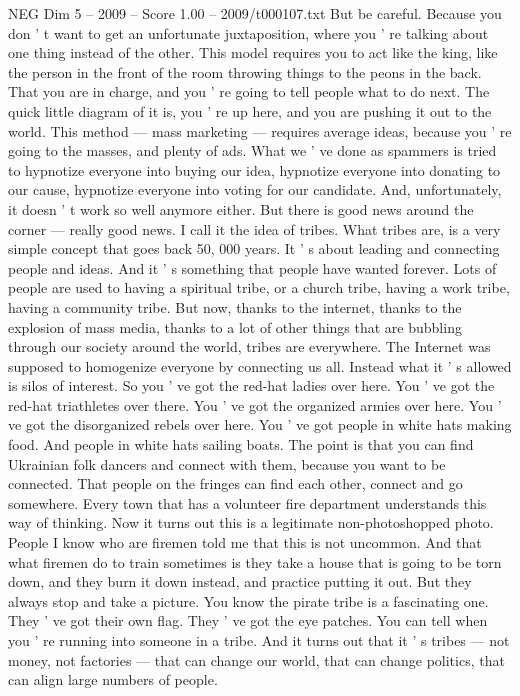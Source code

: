 \begin{textsample}{NEG Dim 5 – 2009 – Score 1.00 – 2009/t000107.txt}
But be careful.
Because you don ' t want to get an unfortunate juxtaposition, where you ' re talking about one thing instead of the other.
This model requires you to act like the king, like the person in the front of the room throwing things to the peons in the back.
That you are in charge, and you ' re going to tell people what to do next.
The quick little diagram of it is, you ' re up here, and you are pushing it out to the world.
This method — mass marketing — requires average ideas, because you ' re going to the masses, and plenty of ads.
What we ' ve done as spammers is tried to hypnotize everyone into buying our idea, hypnotize everyone into donating to our cause, hypnotize everyone into voting for our candidate.
And, unfortunately, it doesn ' t work so well anymore either.
But there is good news around the corner — really good news.
I call it the idea of tribes.
What tribes are, is a very simple concept that goes back 50, 000 years.
It ' s about leading and connecting people and ideas.
And it ' s something that people have wanted forever.
Lots of people are used to having a spiritual tribe, or a church tribe, having a work tribe, having a community tribe.
But now, thanks to the internet, thanks to the explosion of mass media, thanks to a lot of other things that are bubbling through our society around the world, tribes are everywhere.
The Internet was supposed to homogenize everyone by connecting us all.
Instead what it ' s allowed is silos of interest.
So you ' ve got the red-hat ladies over here.
You ' ve got the red-hat triathletes over there.
You ' ve got the organized armies over here.
You ' ve got the disorganized rebels over here.
You ' ve got people in white hats making food.
And people in white hats sailing boats.
The point is that you can find Ukrainian folk dancers and connect with them, because you want to be connected.
That people on the fringes can find each other, connect and go somewhere.
Every town that has a volunteer fire department understands this way of thinking.
Now it turns out this is a legitimate non-photoshopped photo.
People I know who are firemen told me that this is not uncommon.
And that what firemen do to train sometimes is they take a house that is going to be torn down, and they burn it down instead, and practice putting it out.
But they always stop and take a picture.
You know the pirate tribe is a fascinating one.
They ' ve got their own flag.
They ' ve got the eye patches.
You can tell when you ' re running into someone in a tribe.
And it turns out that it ' s tribes — not money, not factories — that can change our world, that can change politics, that can align large numbers of people.

\end{textsample}
